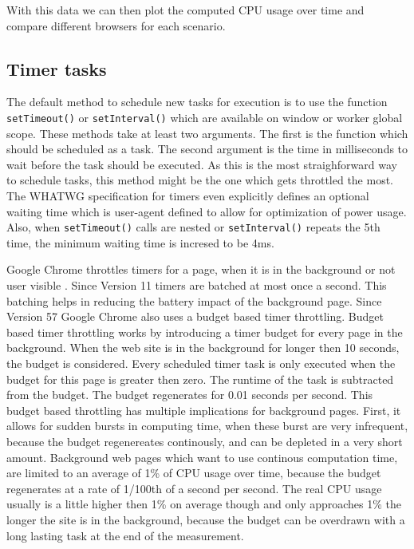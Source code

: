 \documentclass[article,type=bsc,colorback,accentcolor=tud9c]{tudthesis}
\begin{document}
  With this data we can then plot the computed CPU usage over time and compare different browsers for each scenario.

  
  \subsection{Timer tasks}

  The default method to schedule new tasks for execution is to use the function \texttt{setTimeout()} or \texttt{setInterval()} which are available on window or worker global scope. These methods take at least two arguments. The first is the function which should be scheduled as a task. The second argument is the time in milliseconds to wait before the task should be executed. As this is the most straighforward way to schedule tasks, this method might be the one which gets throttled the most. The WHATWG specification for timers\cite{whatwg-timers} even explicitly defines an optional waiting time which is user-agent defined to allow for optimization of power usage. Also, when \texttt{setTimeout()} calls are nested or \texttt{setInterval()} repeats the 5th time, the minimum waiting time is incresed to be 4ms.

  Google Chrome throttles timers for a page, when it is in the background or not user visible \cite{chrome-background-tabs}. Since Version 11 timers are batched at most once a second. This batching helps in reducing the battery impact of the background page. Since Version 57 Google Chrome also uses a budget based timer throttling. Budget based timer throttling works by introducing a timer budget for every page in the background. When the web site is in the background for longer then 10 seconds, the budget is considered. Every scheduled timer task is only executed when the budget for this page is greater then zero. The runtime of the task is subtracted from the budget. The budget regenerates for 0.01 seconds per second. This budget based throttling has multiple implications for background pages. First, it allows for sudden bursts in computing time, when these burst are very infrequent, because the budget regenereates continously, and can be depleted in a very short amount. Background web pages which want to use continous computation time, are limited to an average of 1\% of CPU usage over time, because the budget regenerates at a rate of 1/100th of a second per second. The real CPU usage usually is a little higher then 1\% on average though and only approaches 1\% the longer the site is in the background, because the budget can be overdrawn with a long lasting task at the end of the measurement.
\end{document}
